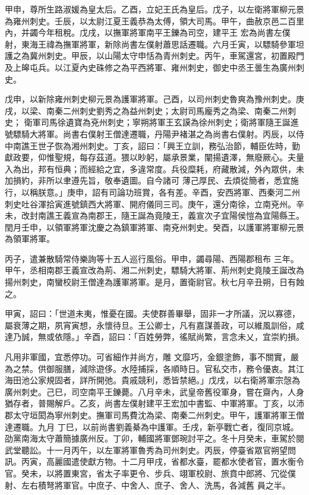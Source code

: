 \begin{pinyinscope}
 甲申，尊所生路淑媛為皇太后。乙酉，立妃王氏為皇后。戊子，以左衛將軍柳元景為雍州刺史。壬辰，以太尉江夏王義恭為太傅，領大司馬。甲午，曲赦京邑二百里內，并蠲今年租稅。戊戌，以撫軍將軍南平王鑠為司空，建平王
 宏為尚書左僕射，東海王禕為撫軍將軍，新除尚書左僕射蕭思話遷職。六月壬寅，以驃騎參軍坦護之為冀州刺史。甲辰，以山陽太守申恬為青州刺史。丙午，車駕還宮，初置殿門及上皞屯兵。以江夏內史硃修之為平西將軍、雍州刺史，御史中丞王曇生為廣州刺史。



 戊申，以新除雍州刺史柳元景為護軍將軍。己酉，以司州刺史魯爽為豫州刺史。庚戌，以梁、南秦二州刺史劉秀之為益州刺史；太尉司馬龐秀之為梁、南秦二州刺史；
 衛軍司馬徐遺寶為兗州刺史；寧朔將軍王玄謨為徐州刺史；衛將軍隨王誕進號驃騎大將軍。尚書右僕射王僧達遷職，丹陽尹褚湛之為尚書右僕射。丙辰，以侍中南譙王世子恢為湘州刺史。丁亥，詔曰：「興王立訓，務弘治節，輔臣佐時，勤獻政要，仰惟聖規，每存茲道。猥以眇躬，屬承景業，闡揚遺澤，無廢厥心。夫量入為出，邦有恒典；而經給之宜，多違常度。兵役糜耗，府藏散減，外內眾供，未加損約，非所以聿遵先旨，敬奉遺圖。自今諸可
 薄己厚民、去煩從簡者，悉宜施行，以稱朕意。」庚申，詔有司論功班賞，各有差。辛酉，安西將軍、西秦河二州刺史吐谷渾拾寅進號鎮西大將軍、開府儀同三司。庚午，還分南徐，立南兗州。辛未，改封南譙王義宣為南郡王，隨王誕為竟陵王，義宣次子宜陽侯愷為宜陽縣王。閏月壬申，以領軍將軍沈慶之為鎮軍將軍、南兗州刺史。癸酉，以護軍將軍柳元景為領軍將軍。



 丙子，遣兼散騎常侍樂詢等十五人巡行風俗。甲申，蠲尋陽、西陽郡租布
 三年。甲午，丞相南郡王義宣改為荊、湘二州刺史，驃騎大將軍、荊州刺史竟陵王誕改為揚州刺史，南蠻校尉王僧達為護軍將軍。是月，置衛尉官。秋七月辛丑朔，日有蝕之。



 甲寅，詔曰：「世道未夷，惟憂在國。夫使群善畢舉，固非一才所議，況以寡德，屬衰薄之期，夙宵寅想，永懷待旦。王公卿士，凡有嘉謀善政，可以維風訓俗，咸達乃誠，無或依隱。」辛酉，詔曰：「百姓勞弊，徭賦尚繁，言念未乂，宜崇約損。



 凡用非軍國，宜悉停功。可省細作并尚方，雕
 文靡巧，金銀塗飾，事不關實，嚴為之禁。供御服膳，減除遊侈。水陸捕採，各順時日。官私交市，務令優衷。其江海田池公家規固者，詳所開弛。貴戚競利，悉皆禁絕。」戊戌，以右衛將軍宗愨為廣州刺史。己巳，司空南平王鑠薨。八月辛未，武皇帝舊役軍身，嘗在齋內，人身猶存者，普賜解戶。乙亥，尚書左僕射建平王宏加中書監、中軍將軍。丁亥，以沛郡太守垣閎為寧州刺史。撫軍司馬費沈為梁、南秦二州刺史。甲午，護軍將軍王僧達遷職。九月
 丁巳，以前尚書劉義綦為中護軍。壬戌，新亭戰亡者，復同京城。劭黨南海太守蕭簡據廣州反。丁卯，輔國將軍鄧琬討平之。冬十月癸未，車駕於閱武堂聽訟。十一月丙午，以左軍將軍魯秀為司州刺史。丙辰，停臺省眾官朔望問訊。丙寅，高麗國遣使獻方物。十二月甲戌，省都水臺，罷都水使者官，置水衡令官。癸未，以將置東宮，省太子率更令、步兵、翊軍校尉、旅賁中郎將、冗從僕射、左右積弩將軍官。中庶子、中舍人、庶子、舍人、洗馬，各減舊
 員之半。




\end{pinyinscope}
